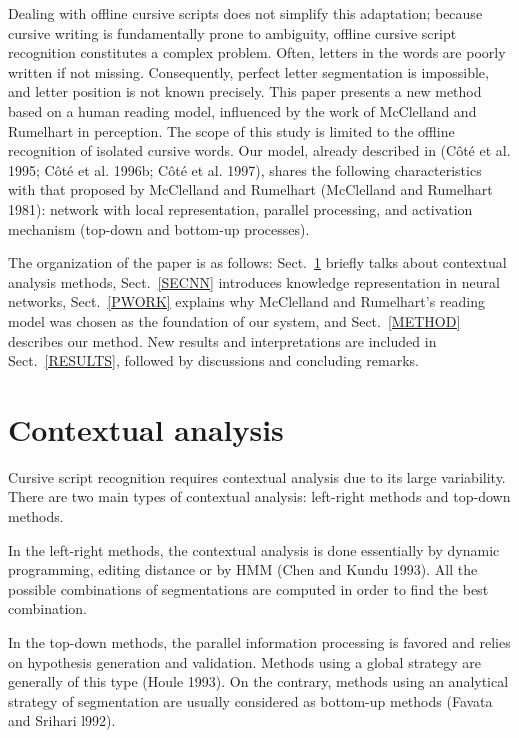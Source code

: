 \documentclass[ijdar]{svjour}
\begin{document}
Dealing with offline cursive scripts does not simplify this adaptation;
because cursive writing is fundamentally prone to ambiguity, offline
cursive script recognition constitutes a complex problem. Often, letters
in the words are poorly written if not missing. Consequently, perfect
letter segmentation is impossible, and letter position is not known
precisely. This paper presents a new method based on a human reading
model, influenced by the work of McClelland and Rumelhart in perception.
The scope of this study is limited to the offline recognition of
isolated cursive words. Our model, already described in (C\^ot\'e et
al. 1995; C\^ot\'e et al. 1996b; C\^ot\'e et al. 1997), shares the
following characteristics with that proposed by McClelland and Rumelhart
(McClelland and Rumelhart 1981): network with local representation,
parallel processing, and activation mechanism (top-down and bottom-up
processes).


The organization of the paper is as follows: Sect.~\ref{SECCONTEXT}
briefly talks about contextual analysis methods, Sect.~\ref{SECNN}
introduces knowledge representation in neural networks,
Sect.~\ref{PWORK} explains why McClelland and Rumelhart's reading
model was chosen as the foundation of our system, and
Sect.~\ref{METHOD} describes our method. New results and
interpretations are included in Sect.~\ref{RESULTS}, followed by
discussions and concluding remarks.

\section{Contextual analysis}
\label{SECCONTEXT}

Cursive script recognition requires contextual analysis due to its large
variability. There are two main types of contextual analysis: left-right
methods and top-down methods.

In the left-right methods, the contextual analysis is done essentially
by dynamic programming, editing distance or by HMM (Chen and Kundu
1993). All the possible combinations of segmentations are computed in
order to find the best combination.

In the top-down methods, the parallel information processing is favored
and relies on hypothesis generation and validation. Methods using a
global strategy are generally of this type (Houle 1993). On the
contrary, methods using an analytical strategy of segmentation are
usually considered as bottom-up methods (Favata and Srihari l992).
\end{document}
